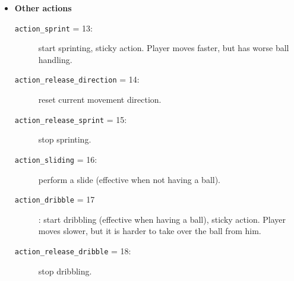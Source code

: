 \begin{itemize}[noitemsep]
  \item \textbf{Other actions}
  \begin{description}
    \item[\texttt{action\_sprint} = 13: ] start sprinting, sticky action. Player moves faster, but has worse ball handling.
    \item[\texttt{action\_release\_direction} = 14: ] reset current movement direction.
    \item[\texttt{action\_release\_sprint} = 15: ] stop sprinting.
    \item[\texttt{action\_sliding} = 16: ] perform a slide (effective when not having a ball).
    \item[\texttt{action\_dribble} = 17]:  start dribbling (effective when having a ball), sticky action. Player moves slower, but it is harder to take over the ball from him.
    \item[\texttt{action\_release\_dribble} = 18: ] stop dribbling.
  \end{description}
\end{itemize}

